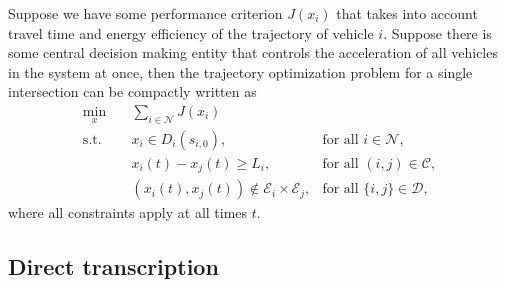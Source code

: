 \documentclass[a4paper]{article}
\theoremstyle{definition}
\theoremstyle{plain}
\begin{document}
Suppose we have some performance criterion $J(x_{i})$ that takes into account
travel time and energy efficiency of the trajectory of vehicle $i$. Suppose
there is some central decision making entity that controls the acceleration of
all vehicles in the system at once, then the trajectory optimization problem for
a single intersection can be compactly written as
\begin{subequations}
\label{eq:offline_single_intersection}
\begin{align}
  \min_{x} \quad & \sum_{i \in \mathcal{N}} J(x_{i}) \\
  \text{s.t.} \quad  & x_{i} \in D_{i}(s_{i,0}) , &\text{for all } i \in \mathcal{N} , \\
                & x_{i}(t) - x_{j}(t) \geq L_{i}, &\text{for all } (i,j) \in \mathcal{C} , \\
                & (x_{i}(t), x_{j}(t))  \notin \mathcal{E}_{i} \times \mathcal{E}_{j} , &\text{for all } \{i,j\} \in \mathcal{D} \label{eq:collision_constraints} ,
\end{align}
\end{subequations}
where all constraints apply at all times $t$.


\subsection{Direct transcription}
\end{document}
